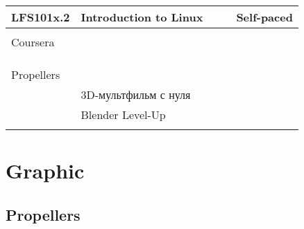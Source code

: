 \documentclass[a4paper,12pt]{article} %
\begin{document}
\begin{longtable}{|l|p{6cm}|c|c|l|}
	\hline
	LFS101x.2 & Introduction to Linux &  &  & Self-paced \\
	\hline
	&  &  &  &  \\
	\hline
	\multicolumn{5}{|l|}{Coursera}\\
	\hline
	&  &  &  &  \\
	\hline
	&  &  &  &  \\
	\hline
	&  &  &  &  \\
	\hline
	\multicolumn{5}{|l|}{Propellers}\\
	\hline
	& 3D-мультфильм с нуля &  &  &  \\
	\hline
	& Blender Level-Up &  &  &  \\
	\hline
	&  &  &  &  \\
	\hline
\end{longtable}

\newpage
\section{Graphic}
\subsection{Propellers}
\end{document}
